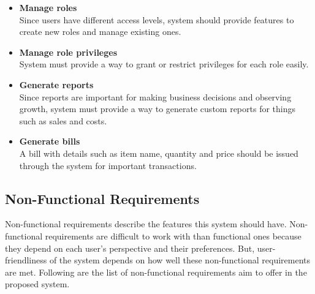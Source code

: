 \documentclass[12pt]{report}
\begin{document}
\begin{itemize}
	\item {\bf{Manage roles}} \\
	      Since users have different access levels, system should provide features to create new roles and manage existing ones.

	\item {\bf{Manage role privileges}} \\
	      System must provide a way to grant or restrict privileges for each role easily.

	\item {\bf{Generate reports}} \\
	      Since reports are important for making business decisions and observing growth, system must provide a way to generate custom reports for things such as sales and costs.

	\item {\bf{Generate bills}} \\
	      A bill with details such as item name, quantity and price should be issued through the system for important transactions.

\end{itemize}

\subsection{Non-Functional Requirements}
Non-functional requirements describe the features this system should have. Non-functional requirements are difficult to work with than functional ones because they depend on each user's perspective and their preferences. But, user-friendliness of the system depends on how well these non-functional requirements are met. Following are the list of non-functional requirements aim to offer in the proposed system.
\end{document}
